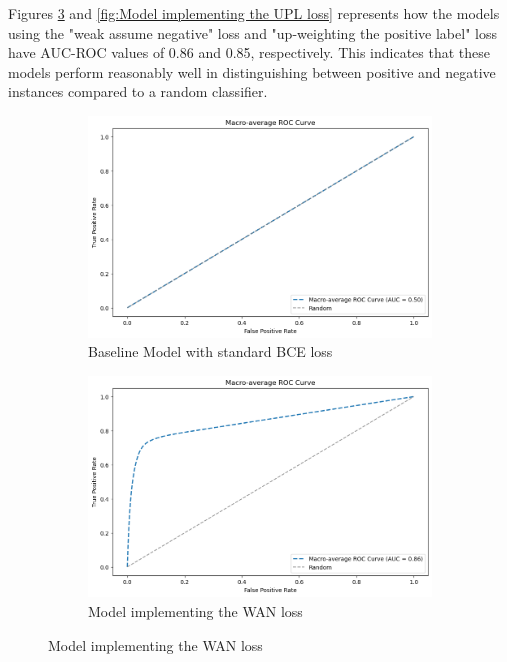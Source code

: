 \documentclass{article}
\begin{document}
Figures \ref{fig:Model implementing the WAN loss} and \ref{fig:Model implementing the UPL loss} represents how the models using the "weak assume negative" loss and "up-weighting the positive label" loss have AUC-ROC values of 0.86 and 0.85, respectively. This indicates that these models perform reasonably well in distinguishing between positive and negative instances compared to a random classifier.

\begin{figure}
    \begin{subfigure}{\textwidth}
        \centering
        \includegraphics[width=0.75\linewidth]{BASELINE.png}
        \caption{Baseline Model with standard BCE loss}
        \label{fig:Baseline Model with standard BCE loss}
    \end{subfigure}

    \vspace{10pt} %

    \begin{subfigure}{\textwidth}
        \centering
        \includegraphics[width=0.75\linewidth]{Model with WAN.png}
        \caption{Model implementing the WAN loss}
        \label{fig:Model implementing the WAN loss}
    \end{subfigure}


\end{figure}
\end{document}
